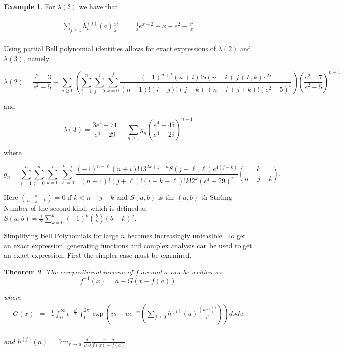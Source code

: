 \documentclass[12pt]{article}
\theoremstyle{plain}
\newtheorem{thm}{Theorem}
\theoremstyle{definition}
\newtheorem{eg}[thm]{Example}
\theoremstyle{remark}
\theoremstyle{definition}
\begin{document}
\begin{eg}
    For $\lambda(2)$ we have that 

    \begin{eqnarray*}
        \sum_{j \geq 1} h_n^{(j)}(a) \frac{x^j}{j!} & = & \frac{1}{x}e^{x+2} + x -e^2 - \frac{e^2}{x}  \\
    \end{eqnarray*}
    
\end{eg}

Using partial Bell polynomial identities allows for exact expressions of $\lambda(2)$ and $\lambda(3)$, namely

\begin{equation*}
    \lambda(2) = \frac{e^2-3}{e^2-5} - \sum_{n \geq 1}\left(\sum_{i=1}^{n}\sum_{j=0}^i\sum_{k=0}^j\frac{(-1)^{n+k}(n+i)!S(n-i+j+k,k)e^{2j}}{(n+1)!(i-j)!(j-k)!(n-i+j+k)!(e^2-5)^{i}}\right) \left(\frac{e^2-7}{e^2-5} \right)^{n+1}
\end{equation*}

and

\begin{equation*}
    \lambda(3) = \frac{3e^4-71}{e^4-29} - \sum_{n\geq1}g_n\left(\frac{e^4-45}{e^4-29}\right)^{n+1}
\end{equation*}

where 

\begin{equation*}
g_n = \sum_{i=1}^n\sum_{j=0}^n\sum_{k=0}^i\sum_{\ell=0}^{k-i}\frac{(-1)^{n-\ell}(n+i)!13^{2k+j-n}S(j+\ell,\ell)e^{4(j-k)}}{(n+1)!(j+\ell)!(i-k-\ell)!k!2^k(e^4-29)^i}\binom{k}{n-j-k}.
\end{equation*}

Here $\binom{k}{n-j-k}=0$ if $k < n-j-k$ and $S(a,b)$ is the $(a,b)$-th Stirling Number of the second kind, which is defined as 
$S(a,b) = \frac{1}{b!}\sum_{k=0}^b(-1)^k \binom{b}{k}(b-k)^{a}$.

Simplifying Bell Polynomials for large $n$ becomes increasingly unfeasible. To get an exact expression, generating functions and complex analysis can be used to get an exact expression. First the simpler case must be examined.


\begin{thm}\label{thm: lagrange gf}
    The compositional inverse of $f$ around $a$ can be written as 
    \begin{equation}
        f^{-1}(x) = a + G(x-f(a))    
    \end{equation}
    
    where 
    \begin{eqnarray*}
        G(x) & = &\frac{1}{\pi} \int_0^\infty e^{-\frac{u^2}{x}} \int_0^{2\pi} \exp\left(is + ue^{-is}\left(\sum_{j\geq0}h^{(j)}(a) \frac{(ue^{is})^j}{j!}\right)\right)ds du \\
    \end{eqnarray*}

    and $h^{(j)}(a) = \lim_{x \to a}\frac{d^{j}}{dx^{j}}\frac{x-a}{f(x)-f(a)}$.
\end{thm}
\end{document}
